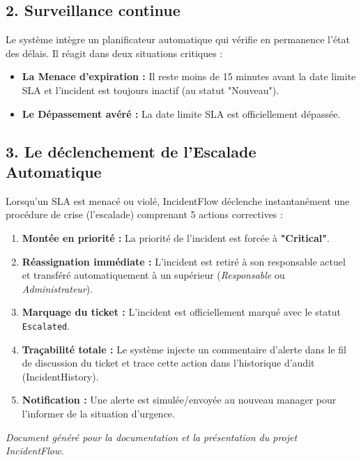 \documentclass[12pt,a4paper]{article}
\begin{document}
\subsection*{2. Surveillance continue}
Le système intègre un planificateur automatique qui vérifie en permanence l'état des délais. Il réagit dans deux situations critiques :
\begin{itemize}[label=\textcolor{primary}{\textbullet}]
    \item \textbf{La Menace d'expiration :} Il reste moins de 15 minutes avant la date limite SLA et l'incident est toujours inactif (au statut "Nouveau").
    \item \textbf{Le Dépassement avéré :} La date limite SLA est officiellement dépassée.
\end{itemize}

\subsection*{3. Le déclenchement de l'Escalade Automatique}
Lorsqu'un SLA est menacé ou violé, IncidentFlow déclenche instantanément une procédure de crise (l'escalade) comprenant 5 actions correctives :
\begin{enumerate}[label=\textbf{\arabic*.}]
    \item \textbf{Montée en priorité :} La priorité de l'incident est forcée à \textbf{"Critical"}.
    \item \textbf{Réassignation immédiate :} L'incident est retiré à son responsable actuel et transféré automatiquement à un supérieur (\textit{Responsable} ou \textit{Administrateur}).
    \item \textbf{Marquage du ticket :} L'incident est officiellement marqué avec le statut \texttt{Escalated}.
    \item \textbf{Traçabilité totale :} Le système injecte un commentaire d'alerte dans le fil de discussion du ticket et trace cette action dans l'historique d'audit (IncidentHistory).
    \item \textbf{Notification :} Une alerte est simulée/envoyée au nouveau manager pour l'informer de la situation d'urgence.
\end{enumerate}

\vspace{1.5cm}
\begin{center}
    \textit{Document généré pour la documentation et la présentation du projet IncidentFlow.}
\end{center}
\end{document}
